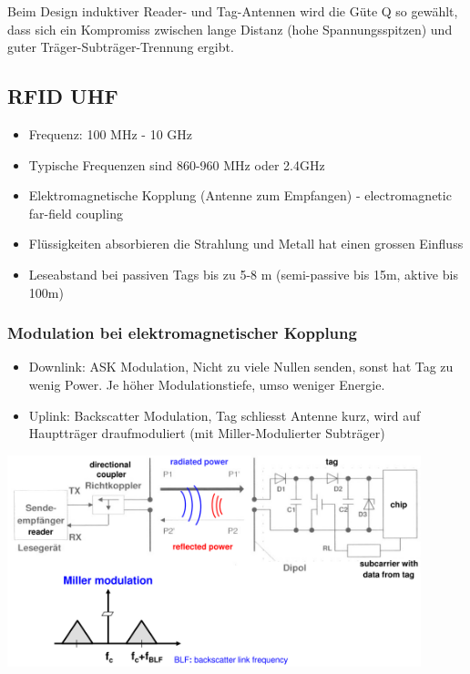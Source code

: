 	Beim Design induktiver Reader- und Tag-Antennen wird die Güte Q so gewählt, dass sich ein Kompromiss zwischen lange Distanz (hohe Spannungsspitzen) 
	und guter Träger-Subträger-Trennung ergibt.
	

\subsection{RFID UHF}
	\begin{itemize}
		\item Frequenz:	100 MHz - 10 GHz
		\item Typische Frequenzen sind 860-960 MHz oder 2.4GHz
		\item Elektromagnetische Kopplung (Antenne zum Empfangen) - electromagnetic far-field coupling
		\item Flüssigkeiten absorbieren die Strahlung und Metall hat einen grossen Einfluss
		\item Leseabstand bei passiven Tags bis zu 5-8 m (semi-passive bis 15m, aktive bis 100m)		
	\end{itemize}

\subsubsection{Modulation bei elektromagnetischer Kopplung}
	\begin{itemize}
		\item Downlink: ASK Modulation, Nicht zu viele Nullen senden, sonst hat Tag zu wenig Power. Je höher Modulationstiefe, umso weniger Energie. 
		\item Uplink: Backscatter Modulation, Tag schliesst Antenne kurz, wird auf Hauptträger draufmoduliert (mit Miller-Modulierter Subträger)
	\end{itemize}

	\begin{minipage}{12cm}
		\begin{center}
			\includegraphics[width=12cm]{./bilder/rfid-millermod.png} 
		\end{center}
	\end{minipage}
	
